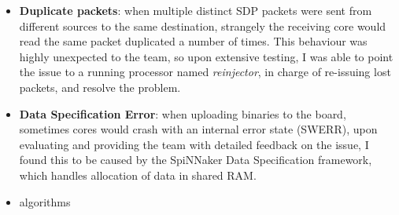 \begin{itemize}
\item \textbf{Duplicate packets}: when multiple distinct SDP packets were sent from different sources to the same destination, strangely the receiving core would read the same packet duplicated a number of times. This behaviour was highly unexpected to the team, so upon extensive testing, I was able to point the issue to a running processor named \textit{reinjector}, in charge of re-issuing lost packets, and resolve the problem. 

\item \textbf{Data Specification Error}: when uploading binaries to the board, sometimes cores would crash with an internal error state (SWERR), upon evaluating and providing the team with detailed feedback on the issue, I found this to be caused by the SpiNNaker Data Specification framework, which handles allocation of data in shared RAM.

\item algorithms

\end{itemize}







